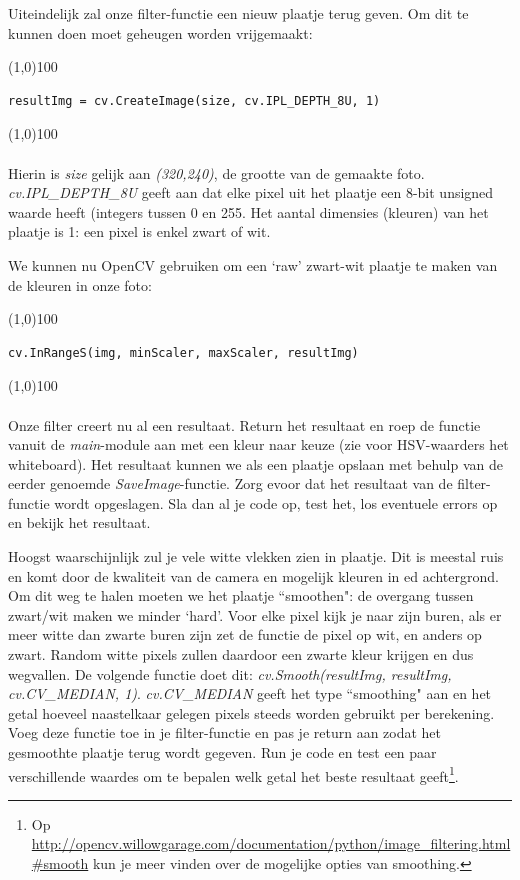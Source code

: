 \documentclass[a4paper, twoside]{article}
\begin{document}
Uiteindelijk zal onze filter-functie een nieuw plaatje terug geven. Om dit te kunnen doen moet geheugen worden vrijgemaakt:

\noindent \line(1,0){100}
\begin{verbatim}
resultImg = cv.CreateImage(size, cv.IPL_DEPTH_8U, 1)
\end{verbatim}
\noindent \line(1,0){100}
\\\\
Hierin is \textit{size} gelijk aan \textit{(320,240)}, de grootte van de gemaakte foto. \textit{cv.IPL\_DEPTH\_8U} geeft aan dat elke pixel uit het plaatje een 8-bit unsigned waarde heeft (integers tussen 0 en 255. Het aantal dimensies (kleuren) van het plaatje is 1: een pixel is enkel zwart of wit.

We kunnen nu OpenCV gebruiken om een `raw' zwart-wit plaatje te maken van de kleuren in onze foto:

\noindent \line(1,0){100}
\begin{verbatim}
cv.InRangeS(img, minScaler, maxScaler, resultImg)
\end{verbatim}
\noindent \line(1,0){100}
\\\\
Onze filter creert nu al een resultaat. Return het resultaat en roep de functie vanuit de \textit{main}-module aan met een kleur naar keuze (zie voor HSV-waarders het whiteboard). 
Het resultaat kunnen we als een plaatje opslaan met behulp van de eerder genoemde \textit{SaveImage}-functie. Zorg evoor dat het resultaat van de filter-functie wordt opgeslagen. Sla dan al je code op, test het, los eventuele errors op en bekijk het resultaat.

Hoogst waarschijnlijk zul je vele witte vlekken zien in plaatje. Dit is meestal ruis en komt door de kwaliteit van de camera en mogelijk kleuren in ed achtergrond. Om dit weg te halen moeten we het plaatje ``smoothen": de overgang tussen zwart/wit maken we minder `hard'. Voor elke pixel kijk je naar zijn buren, als er meer witte dan zwarte buren zijn zet de functie de pixel op wit, en anders op zwart. Random witte pixels zullen daardoor een zwarte kleur krijgen en dus wegvallen. De volgende functie doet dit: \textit{cv.Smooth(resultImg, resultImg, cv.CV\_MEDIAN, 1)}. \textit{cv.CV\_MEDIAN} geeft het type ``smoothing" aan en het getal hoeveel naastelkaar gelegen pixels steeds worden gebruikt per berekening. Voeg deze functie toe in je filter-functie en pas je return aan zodat het gesmoothte plaatje terug wordt gegeven. 
Run je code en test een paar verschillende waardes om te bepalen welk getal het beste resultaat geeft\footnote{Op \url{http://opencv.willowgarage.com/documentation/python/image_filtering.html\#smooth} kun je meer vinden over de mogelijke opties van smoothing.}.
\end{document}
